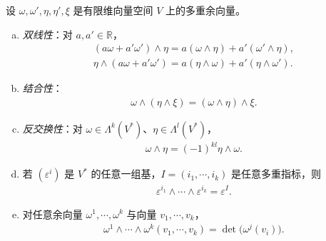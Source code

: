 \documentclass[../../main.tex]{subfiles}
\begin{document}
\begin{proposition}[外积的性质]\label{proposition:ch14-wedge-props}
设 $\omega,\omega',\eta,\eta',\xi$ 是有限维向量空间 $V$ 上的多重余向量。
\begin{enumerate}[(a)]
\item \emph{双线性}：对 $a,a'\in\mathbb{R}$，
\begin{align*}
(a\omega+a'\omega')\wedge\eta=a(\omega\wedge\eta)+a'(\omega'\wedge\eta),\\
\eta\wedge(a\omega+a'\omega')=a(\eta\wedge\omega)+a'(\eta\wedge\omega').
\end{align*}
\item \emph{结合性}：
\begin{align*}
\omega\wedge(\eta\wedge\xi)=(\omega\wedge\eta)\wedge\xi.
\end{align*}
\item \emph{反交换性}：对 $\omega\in\Lambda^k(V^*)$、$\eta\in\Lambda^l(V^*)$，
\begin{align}
\omega\wedge\eta=(-1)^{kl}\eta\wedge\omega.\label{align:ch14-anticomm}
\end{align}
\item 若 $(\varepsilon^i)$ 是 $V^*$ 的任意一组基，$I=(i_1,\cdots ,i_k)$ 是任意多重指标，则
\begin{align}
\varepsilon^{i_1}\wedge\cdots\wedge\varepsilon^{i_k}=\varepsilon^I.\label{align:ch14-epsilon-basis}
\end{align}
\item 对任意余向量 $\omega^1,\cdots ,\omega^k$ 与向量 $v_1,\cdots ,v_k$，
\begin{align}
\omega^1\wedge\cdots\wedge\omega^k(v_1,\cdots ,v_k)=\det\bigl(\omega^j(v_i)\bigr).\label{align:ch14-wedge-det}
\end{align}
\end{enumerate}
\end{proposition}
\end{document}
